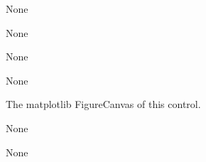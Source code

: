 \documentclass[letterpaper,10pt,english]{sphinxmanual}
\begin{document}
\begin{fulllineitems}
\begin{fulllineitems}
\label{api:mpl.Canvas.axes_enter_action}
None

\end{fulllineitems}


\begin{fulllineitems}
\label{api:mpl.Canvas.axes_leave_action}
None

\end{fulllineitems}


\begin{fulllineitems}
\label{api:mpl.Canvas.button_press_action}
None

\end{fulllineitems}


\begin{fulllineitems}
\label{api:mpl.Canvas.button_release_action}
None

\end{fulllineitems}


\begin{fulllineitems}
\label{api:mpl.Canvas.canvas}
The matplotlib FigureCanvas of this control.

\end{fulllineitems}


\begin{fulllineitems}
\label{api:mpl.Canvas.clear_events}
None

\end{fulllineitems}


\begin{fulllineitems}
\label{api:mpl.Canvas.draw_action}
None

\end{fulllineitems}


\end{fulllineitems}
\end{document}
